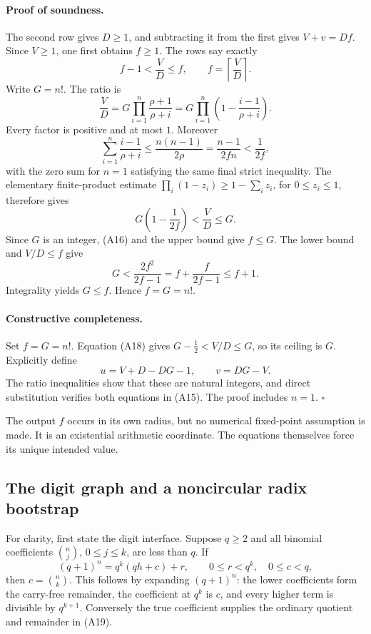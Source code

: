 \paragraph{Proof of soundness.}
The second row gives \(D\ge1\), and subtracting it from the first gives
\(V+v=Df\).  Since \(V\ge1\), one first obtains \(f\ge1\).
The rows say exactly
\[
 f-1<\frac VD\le f,\qquad
 f=\left\lceil\frac VD\right\rceil.                     \tag{A16}
\]
Write \(G=n!\).  The ratio is
\[
 \frac VD
 =G\prod_{i=1}^{n}\frac{\rho+1}{\rho+i}
 =G\prod_{i=1}^{n}
       \left(1-\frac{i-1}{\rho+i}\right).               \tag{A17}
\]
Every factor is positive and at most \(1\).  Moreover
\[
 \sum_{i=1}^{n}\frac{i-1}{\rho+i}
 \le\frac{n(n-1)}{2\rho}
 =\frac{n-1}{2fn}<\frac1{2f},
\]
with the zero sum for \(n=1\) satisfying the same final strict inequality.
The elementary finite-product estimate
\(\prod_i(1-z_i)\ge1-\sum_i z_i\), for \(0\le z_i\le1\),
therefore gives
\[
 G\left(1-\frac1{2f}\right)<\frac VD\le G.               \tag{A18}
\]
Since \(G\) is an integer, (A16) and the upper bound give \(f\le G\).
The lower bound and \(V/D\le f\) give
\[
 G<\frac{2f^2}{2f-1}
   =f+\frac f{2f-1}\le f+1.
\]
Integrality yields \(G\le f\).  Hence \(f=G=n!\).

\paragraph{Constructive completeness.}
Set \(f=G=n!\).  Equation (A18) gives
\(G-\tfrac12<V/D\le G\), so its ceiling is \(G\).
Explicitly define
\[
 u=V+D-DG-1,\qquad v=DG-V.
\]
The ratio inequalities show that these are natural integers, and
direct substitution verifies both equations in (A15).
The proof includes \(n=1\).
\hfill\(\square\)

The output \(f\) occurs in its own radius, but no numerical fixed-point
assumption is made.  It is an existential arithmetic coordinate.
The equations themselves force its unique intended value.

\subsection{The digit graph and a noncircular radix bootstrap}

For clarity, first state the digit interface.  Suppose \(q\ge2\) and
all binomial coefficients \(\binom nj\), \(0\le j\le k\), are less than
\(q\).  If
\[
 (q+1)^n=q^k(qh+c)+r,\qquad
 0\le r<q^k,\quad 0\le c<q,                             \tag{A19}
\]
then \(c=\binom nk\).  This follows by expanding \((q+1)^n\):
the lower coefficients form the carry-free remainder, the coefficient
at \(q^k\) is \(c\), and every higher term is divisible by \(q^{k+1}\).
Conversely the true coefficient supplies the ordinary quotient and
remainder in (A19).

